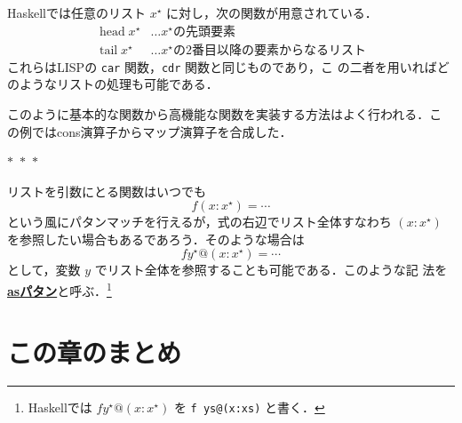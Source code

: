 \documentclass[a5paper,twoside,fleqn,draft]{jsbook}
\newcommand{\separator}{\begin{center}$*$~$*$~$*$\end{center}}
\newcommand{\programminglanguage}[1]{\textsf{#1}}
\newcommand{\haskell}{\programminglanguage{Haskell}}
\newcommand{\lisp}{\programminglanguage{LISP}}
\newcommand{\keyword}[1]{{\underline{\textbf{#1}}}}
\newcommand{\code}[1]{\texttt{#1}}
\newcommand{\mSpecialFunc}[1]{#1}
\DeclareMathOperator{\mHead}{\mSpecialFunc{head}}
\DeclareMathOperator{\mTail}{\mSpecialFunc{tail}}
\newcommand{\mList}[1]{{#1}^\mathrm{\star}}
\begin{document}
\haskell では任意のリスト $\mList{x}$ に対し，次の関数が用意されている．
\begin{align*}
  \mHead\mList{x}
  &\dots\text{$\mList{x}$の先頭要素}\\
  \mTail\mList{x}
  &\dots\text{$\mList{x}$の2番目以降の要素からなるリスト}
\end{align*}
これらは\lisp の \code{car} 関数，\code{cdr} 関数と同じものであり，こ
の二者を用いればどのようなリストの処理も可能である．

このように基本的な関数から高機能な関数を実装する方法はよく行われる．こ
の例ではcons演算子からマップ演算子を合成した．

\separator

リストを引数にとる関数はいつでも
\begin{equation}
  f(x:\mList{x})
  =\dotsb
\end{equation}
という風にパタンマッチを行えるが，式の右辺でリスト全体すなわち
$(x:\mList{x})$ を参照したい場合もあるであろう．そのような場合は
\begin{equation}
  f\mList{y}@(x:\mList{x})
  =\dotsb
\end{equation}
として，変数 $y$ でリスト全体を参照することも可能である．このような記
法を\keyword{asパタン}と呼ぶ．\footnote{\haskell では
  $f\mList{y}@(x:\mList{x})$ を \code{f ys@(x:xs)} と書く．}

\section{この章のまとめ}
\end{document}
